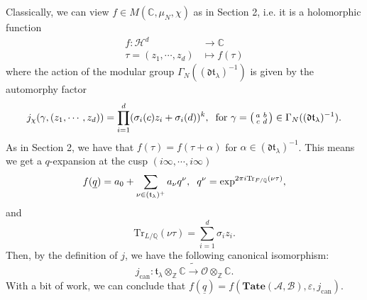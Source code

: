 \documentclass[a4paper,oneside]{amsart}
\theoremstyle{plain}
\theoremstyle{definition}
\begin{document}
Classically, we can view $f \in M(\mathbb{C}, \mu_{N}, \chi)$ as in Section 2, i.e. it is a holomorphic function
\begin{align*}
    f: \mathcal{H}^d &\longrightarrow \mathbb{C} \\
     \tau=(z_1, \cdots, z_d) &\mapsto f(\tau)
\end{align*}
where the action of the modular group $\Gamma_N((\mathfrak{dt}_{\lambda})^{-1})$ is given by the automorphy factor 
\begin{equation*}
    j_\chi(\gamma, (z_1, \cdots, z_d)) = \prod_{i=1}^d (\sigma_i(c)z_i + \sigma_i(d))^k, \hspace{2mm} \text{for } \gamma = \left( \begin{smallmatrix} a & b \\ c & d \end{smallmatrix} \right) \in \Gamma_N((\mathfrak{dt}_{\lambda})^{-1}).
\end{equation*}
As in Section 2, we have that $f(\tau)=f(\tau + \alpha)$ for $\alpha \in (\mathfrak{dt}_\lambda)^{-1}$. This means we get a $q$-expansion at the cusp $(i\infty, \cdots, i\infty)$
\begin{equation*}
    f(\underline{q}) = a_0 + \sum_{\nu \in (\mathfrak{t}_\lambda)^+} a_\nu q^\nu, \hspace{2mm} q^\nu=\text{exp}^{2\pi i\text{Tr}_{F/\mathbb{Q}}(\nu \tau)}, 
\end{equation*}
and 
\begin{equation*}
    \text{Tr}_{L/\mathbb{Q}}(\nu \tau) = \sum_{i=1}^d \sigma_iz_i.
\end{equation*}
Then, by the definition of $j$, we have the following canonical isomorphism:
\begin{equation*}
    j_\text{can}: \mathfrak{t}_\lambda \otimes_{\mathbb{Z}} \mathbb{C} \tilde{\longrightarrow} \mathcal{O} \otimes_{\mathbb{Z}} \mathbb{C}.
\end{equation*}
With a bit of work, we can conclude that $f(\underline{q})=f(\textbf{Tate}(\mathcal{A}, \mathcal{B}), \varepsilon, j_\text{can})$.
\end{document}

